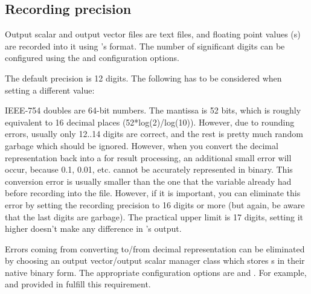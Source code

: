 \subsection{Recording precision}
\label{sec:outputfile-precision}

Output scalar and output vector files are text files, and floating point
values (s) are recorded into it using 's
 format. The number of significant digits can be configured
using the  and 
configuration options.

The default precision is 12 digits. The following has to be considered when
setting a different value:

IEEE-754 doubles are 64-bit numbers. The mantissa is 52 bits, which is
roughly equivalent to 16 decimal places (52*log(2)/log(10)). However, due
to rounding errors, usually only 12..14 digits are correct, and the rest is
pretty much random garbage which should be ignored. However, when you
convert the decimal representation back into a  for result
processing, an additional small error will occur, because 0.1, 0.01, etc.
cannot be accurately represented in binary. This conversion error is
usually smaller than the one that the  variable already had
before recording into the file. However, if it is important, you can
eliminate this error by setting the recording precision to 16 digits or
more (but again, be aware that the last digits are garbage). The practical
upper limit is 17 digits, setting it higher doesn't make any difference in
's output.

%
%
%

Errors coming from converting to/from decimal representation can be
eliminated by choosing an output vector/output scalar manager class
which stores s in their native binary form.
The appropriate configuration options are 
and . For example,
 and 
provided in  fulfill this requirement.

